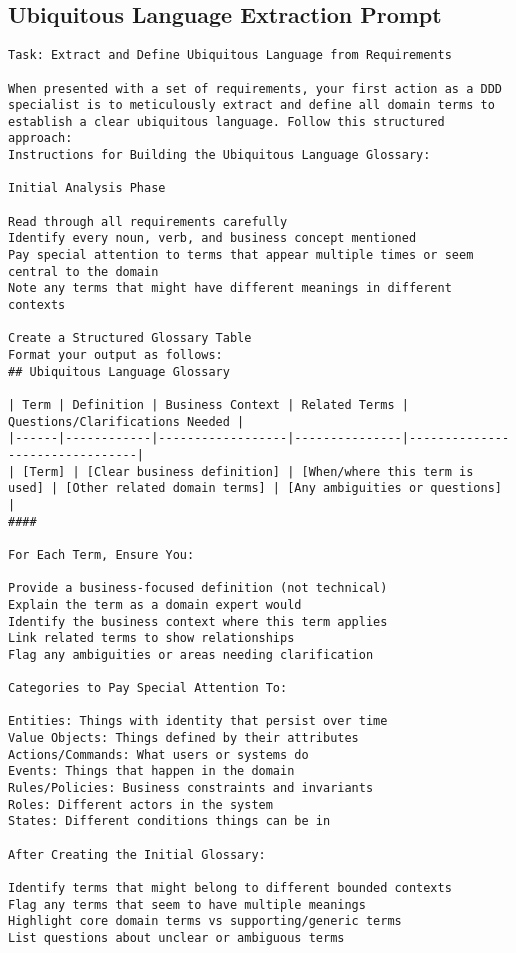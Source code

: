 \subsection{Ubiquitous Language Extraction Prompt}\label{app:ubiquitous-language-prompt}
\begin{Verbatim}[breaklines=true]
Task: Extract and Define Ubiquitous Language from Requirements

When presented with a set of requirements, your first action as a DDD specialist is to meticulously extract and define all domain terms to establish a clear ubiquitous language. Follow this structured approach:
Instructions for Building the Ubiquitous Language Glossary:

Initial Analysis Phase

Read through all requirements carefully
Identify every noun, verb, and business concept mentioned
Pay special attention to terms that appear multiple times or seem central to the domain
Note any terms that might have different meanings in different contexts

Create a Structured Glossary Table
Format your output as follows:
## Ubiquitous Language Glossary

| Term | Definition | Business Context | Related Terms | Questions/Clarifications Needed |
|------|------------|------------------|---------------|--------------------------------|
| [Term] | [Clear business definition] | [When/where this term is used] | [Other related domain terms] | [Any ambiguities or questions] |
####

For Each Term, Ensure You:

Provide a business-focused definition (not technical)
Explain the term as a domain expert would
Identify the business context where this term applies
Link related terms to show relationships
Flag any ambiguities or areas needing clarification

Categories to Pay Special Attention To:

Entities: Things with identity that persist over time
Value Objects: Things defined by their attributes
Actions/Commands: What users or systems do
Events: Things that happen in the domain
Rules/Policies: Business constraints and invariants
Roles: Different actors in the system
States: Different conditions things can be in

After Creating the Initial Glossary:

Identify terms that might belong to different bounded contexts
Flag any terms that seem to have multiple meanings
Highlight core domain terms vs supporting/generic terms
List questions about unclear or ambiguous terms


\end{Verbatim}
